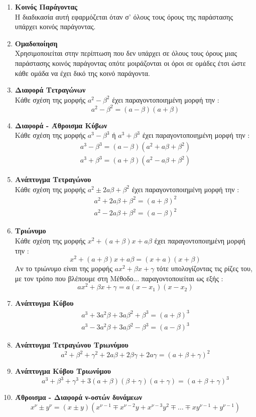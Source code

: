 \documentclass[twoside,10pt]{book}
\begin{document}
\begin{enumerate}[itemsep=0mm,label=\bf\arabic*.]
\item \textbf{Κοινός Παράγοντας}\\
Η διαδικασία αυτή εφαρμόζεται όταν σ' όλους τους όρους της παράστασης υπάρχει κοινός παράγοντας.
\item \textbf{Ομαδοποίηση}\\
Χρησιμοποιείται στην περίπτωση που δεν υπάρχει σε όλους τους όρους μιας παράστασης κοινός παράγοντας οπότε μοιράζονται οι όροι σε ομάδες έτσι ώστε κάθε ομάδα να έχει δικό της κοινό παράγοντα.
\item \textbf{Διαφορά Τετραγώνων}\\
Κάθε σχέση της μορφής $ a^2-\beta^2 $ έχει παραγοντοποιημένη μορφή την : \[ a^2-\beta^2=(a-\beta)(a+\beta) \]
\item \textbf{Διαφορά - Άθροισμα Κύβων}\\
Κάθε σχέση της μορφής $ a^3-\beta^3 $ ή $ a^3+\beta^3 $ έχει παραγοντοποιημένη μορφή την : \begin{gather*}
a^3-\beta^3=(a-\beta)\left(a^2+a\beta+\beta^2 \right)\\
a^3+\beta^3=(a+\beta)\left(a^2-a\beta+\beta^2 \right)
\end{gather*}
\item \textbf{Ανάπτυγμα Τετραγώνου}\\
Κάθε σχέση της μορφής $ a^2\pm2a\beta+\beta^2 $ έχει παραγοντοποιημένη μορφή την :
\begin{gather*}
a^2+2a\beta+\beta^2=(a+\beta)^2\\
a^2-2a\beta+\beta^2=(a-\beta)^2
\end{gather*}
\item \textbf{Τριώνυμο}\\
Κάθε σχέση της μορφής $ x^2+(a+\beta)x+a\beta $ έχει παραγοντοποιημένη μορφή
την : \[ x^2+(a+\beta)x+a\beta=(x+a)(x+\beta) \]
Αν το τριώνυμο είναι της μορφής $ ax^2+\beta x+\gamma $ τότε υπολογίζοντας τις ρίζες του, με τον τρόπο που βλέπουμε στη Μέθοδο... παραγοντοποιείται ως εξής :
\[ ax^2+\beta x+\gamma=a(x-x_1)(x-x_2) \]
\item \textbf{Ανάπτυγμα Κύβου}
\begin{gather*}
a^3+3a^2\beta+3a\beta^2+\beta^3=\left( a+\beta\right)^3\\
a^3-3a^2\beta+3a\beta^2-\beta^3=\left( a-\beta\right)^3
\end{gather*}
\item \textbf{Ανάπτυγμα Τετραγώνου Τριωνύμου}
\[ a^2+\beta^2+\gamma^2+2a\beta+2\beta\gamma+2a\gamma=\left( a+\beta+\gamma\right)^2 \]
\item \textbf{Ανάπτυγμα Κύβου Τριωνύμου}
\[ a^3+\beta^3+\gamma^3+3(a+\beta)(\beta+\gamma)(a+\gamma)=\left( a+\beta+\gamma\right)^3 \]
\item \textbf{Άθροισμα - Διαφορά ν-οστών δυνάμεων}
\[ x^\nu\pm y^\nu=(x\pm y)\left(x^{\nu-1}\mp x^{\nu-2}y+x^{\nu-3}y^2\mp\ldots\mp x y^{\nu-1}+y^{\nu-1}\right) \]
\end{enumerate}
\end{document}
